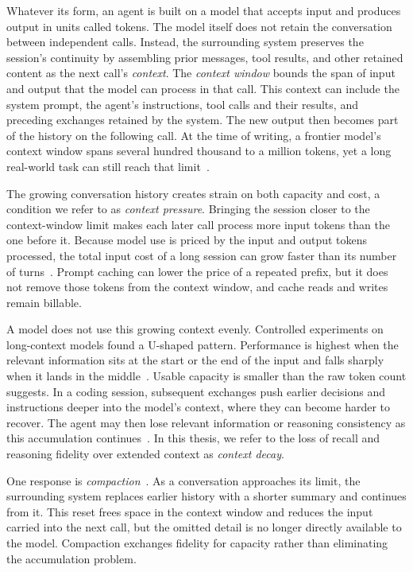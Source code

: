 Whatever its form, an agent is built on a model that accepts input and produces output in units called tokens. The model itself does not retain the conversation between independent calls. Instead, the surrounding system preserves the session's continuity by assembling prior messages, tool results, and other retained content as the next call's \emph{context}. The \emph{context window} bounds the span of input and output that the model can process in that call. This context can include the system prompt, the agent's instructions, tool calls and their results, and preceding exchanges retained by the system. The new output then becomes part of the history on the following call. At the time of writing, a frontier model's context window spans several hundred thousand to a million tokens, yet a long real-world task can still reach that limit~\cite{anthropic2026contextwindows,anthropic2026claudecodeworks}.

The growing conversation history creates strain on both capacity and cost, a condition we refer to as \emph{context pressure}. Bringing the session closer to the context-window limit makes each later call process more input tokens than the one before it. Because model use is priced by the input and output tokens processed, the total input cost of a long session can grow faster than its number of turns~\cite{gao2025turncontrol}. Prompt caching can lower the price of a repeated prefix, but it does not remove those tokens from the context window, and cache reads and writes remain billable.

A model does not use this growing context evenly. Controlled experiments on long-context models found a U-shaped pattern. Performance is highest when the relevant information sits at the start or the end of the input and falls sharply when it lands in the middle~\cite{nliu2023lostmiddle}. Usable capacity is smaller than the raw token count suggests. In a coding session, subsequent exchanges push earlier decisions and instructions deeper into the model's context, where they can become harder to recover. The agent may then lose relevant information or reasoning consistency as this accumulation continues~\cite{nliu2023lostmiddle, anthropic2026contextwindows}. In this thesis, we refer to the loss of recall and reasoning fidelity over extended context as \emph{context decay}.

One response is \emph{compaction}~\cite{anthropic2026contextwindows}. As a conversation approaches its limit, the surrounding system replaces earlier history with a shorter summary and continues from it. This reset frees space in the context window and reduces the input carried into the next call, but the omitted detail is no longer directly available to the model. Compaction exchanges fidelity for capacity rather than eliminating the accumulation problem.

